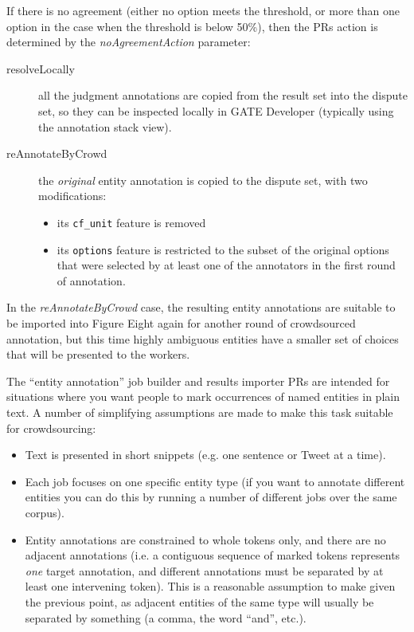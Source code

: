 If there is no agreement (either no option meets the threshold, or more than
one option in the case when the threshold is below 50\%), then the PRs action
is determined by the \emph{noAgreementAction} parameter:
\begin{description}
\item[resolveLocally] all the judgment annotations are copied from the result
  set into the dispute set, so they can be inspected locally in GATE Developer
  (typically using the annotation stack view).
\item[reAnnotateByCrowd] the \emph{original} entity annotation is copied to the
  dispute set, with two modifications:
  \begin{itemize}
  \item its \verb!cf_unit! feature is removed
  \item its \verb!options! feature is restricted to the subset of the original
    options that were selected by at least one of the annotators in the first
    round of annotation.
  \end{itemize}
\end{description}

In the \emph{reAnnotateByCrowd} case, the resulting entity annotations are
suitable to be imported into Figure Eight again for another round of
crowdsourced annotation, but this time highly ambiguous entities have a smaller
set of choices that will be presented to the workers.


The ``entity annotation'' job builder and results importer PRs are intended
for situations where you want people to mark occurrences of named entities in
plain text.  A number of simplifying assumptions are made to make this task
suitable for crowdsourcing:
\begin{itemize}
\item Text is presented in short snippets (e.g. one sentence or Tweet at a
  time).
\item Each job focuses on one specific entity type (if you want to annotate
  different entities you can do this by running a number of different jobs over
  the same corpus).
\item Entity annotations are constrained to whole tokens only, and there are no
  adjacent annotations (i.e. a contiguous sequence of marked tokens represents
  \emph{one} target annotation, and different annotations must be separated
  by at least one intervening token).  This is a reasonable assumption to make
  given the previous point, as adjacent entities of the same type will usually
  be separated by something (a comma, the word ``and'', etc.).
\end{itemize}

